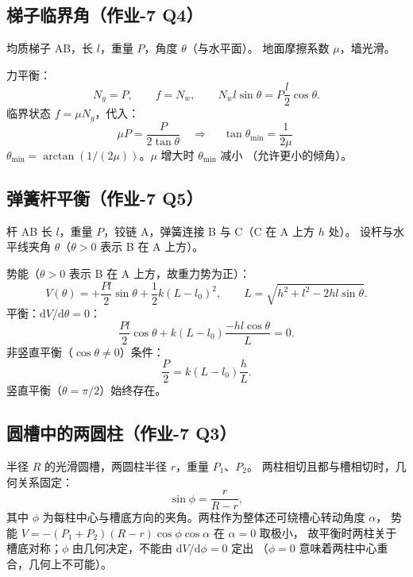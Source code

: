 \documentclass[UTF8,a4paper,11pt]{ctexart}
\begin{document}
\subsection{梯子临界角（作业-7 Q4）}
\label{sub:ladder}

均质梯子 AB，长 $l$，重量 $P$，角度 $\theta$（与水平面）。
地面摩擦系数 $\mu$，墙光滑。

力平衡：
\begin{equation}
  N_g=P,\qquad f=N_w,\qquad N_w l\sin\theta = P\frac{l}{2}\cos\theta.
\end{equation}
临界状态 $f=\mu N_g$，代入：
\begin{equation}
  \mu P = \frac{P}{2\tan\theta}
  \quad\Longrightarrow\quad
  \boxed{\;\tan\theta_{\min}=\frac{1}{2\mu}\;}
  \label{eq:ladder-critical}
\end{equation}
$\theta_{\min}=\arctan(1/(2\mu))$。$\mu$ 增大时 $\theta_{\min}$ 减小
（允许更小的倾角）。

\subsection{弹簧杆平衡（作业-7 Q5）}
\label{sub:spring-rod}

杆 AB 长 $l$，重量 $P$，铰链 A，弹簧连接 B 与 C（C 在 A 上方 $h$ 处）。
设杆与水平线夹角 $\theta$（$\theta>0$ 表示 B 在 A 上方）。

势能（$\theta>0$ 表示 B 在 A 上方，故重力势为正）：
\begin{equation}
  V(\theta)=+\frac{Pl}{2}\sin\theta+\frac12 k\left(L-l_0\right)^2,
  \qquad L=\sqrt{h^2+l^2-2hl\sin\theta}.
\end{equation}
平衡：$\mathrm dV/\mathrm d\theta=0$：
\begin{equation}
  \frac{Pl}{2}\cos\theta
  + k\left(L-l_0\right)\frac{-hl\cos\theta}{L}=0.
\end{equation}
非竖直平衡（$\cos\theta\ne0$）条件：
\begin{equation}
  \frac{P}{2}=k\left(L-l_0\right)\frac{h}{L}.
\end{equation}
竖直平衡（$\theta=\pi/2$）始终存在。

\subsection{圆槽中的两圆柱（作业-7 Q3）}
\label{sub:cylinders}

半径 $R$ 的光滑圆槽，两圆柱半径 $r$，重量 $P_1$、$P_2$。
两柱相切且都与槽相切时，几何关系固定：
\begin{equation}
  \sin\phi=\frac{r}{R-r},
\end{equation}
其中 $\phi$ 为每柱中心与槽底方向的夹角。两柱作为整体还可绕槽心转动角度 $\alpha$，
势能 $V=-(P_1+P_2)(R-r)\cos\phi\cos\alpha$ 在 $\alpha=0$ 取极小，
故平衡时两柱关于槽底对称；$\phi$ 由几何决定，不能由 $\mathrm dV/\mathrm d\phi=0$ 定出
（$\phi=0$ 意味着两柱中心重合，几何上不可能）。
\end{document}
